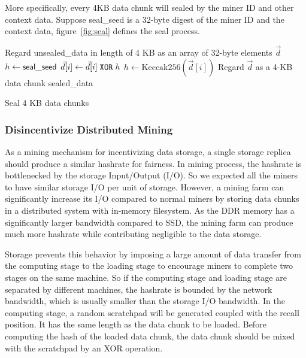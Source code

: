 More specifically, every 4KB data chunk will sealed by the miner ID and other context data. 
%
Suppose {\sf seal\_seed} is a 32-byte digest of the miner ID and the context data, figure~\ref{fig:seal} defines the seal process.
%

\begin{algorithm}
	\small
	\SetNlSty{}{}{}
	\DontPrintSemicolon
	Regard {\sf unsealed\_data} in length of 4 KB as an array of 32-byte elements $\vec{d}$\;
	$h\leftarrow {\sf seal\_seed}$\;
	 {
		$\vec{d}[i]\leftarrow \vec{d}[i]{\;\tt XOR\;} h$\;
		$h\leftarrow \textrm{Keccak256}(\vec{d}[i])$\;
	}
	Regard $\vec{d}$ as a 4-KB data chunk {\sf sealed\_data}\;
	\caption{Seal 4 KB data chunks}
	\label{fig:seal}
	\vspace{-4mm}
\end{algorithm}

\subsubsection{Disincentivize Distributed Mining}

As a mining mechanism for incentivizing data storage, a single storage replica should produce a similar hashrate for fairness.
%
In {\sproof} mining process, the hashrate is bottlenecked by the storage Input/Output (I/O). 
%
So we expected all the miners to have similar storage I/O per unit of storage. 
%
However, a mining farm can significantly increase its I/O compared to normal miners by storing data chunks in a distributed system with in-memory filesystem.
%
As the DDR memory has a significantly larger bandwidth compared to SSD, the mining farm can produce much more hashrate while contributing negligible to the data storage. 

\projabbrev Storage prevents this behavior by imposing a large amount of data transfer from the computing stage to the loading stage to encourage miners to complete two stages on the same machine. 
%
So if the computing stage and loading stage are separated by different machines, the hashrate is bounded by the network bandwidth, which is usually smaller than the storage I/O bandwidth.
%
In the computing stage, a random scratchpad will be generated coupled with the recall position. 
%
It has the same length as the data chunk to be loaded. 
%
Before computing the hash of the loaded data chunk, the data chunk should be mixed with the scratchpad by an XOR operation.


